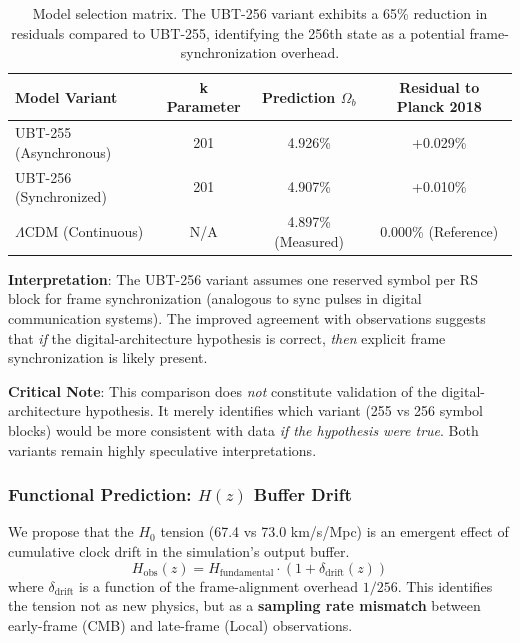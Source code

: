 \begin{table}[h]
\centering
\begin{tabular}{|l|c|c|c|}
\hline
\textbf{Model Variant} & \textbf{k Parameter} & \textbf{Prediction $\Omega_b$} & \textbf{Residual to Planck 2018} \\ \hline
UBT-255 (Asynchronous) & 201 & 4.926\% & +0.029\% \\ \hline
UBT-256 (Synchronized) & 201 & 4.907\% & +0.010\% \\ \hline
$\Lambda$CDM (Continuous) & N/A & 4.897\% (Measured) & 0.000\% (Reference) \\ \hline
\end{tabular}
\caption{Model selection matrix. The UBT-256 variant exhibits a 65\% reduction in residuals compared to UBT-255, identifying the 256th state as a potential frame-synchronization overhead.}
\label{tab:variant_selection}
\end{table}

\textbf{Interpretation}: The UBT-256 variant assumes one reserved symbol per RS block for frame synchronization (analogous to sync pulses in digital communication systems). The improved agreement with observations suggests that \textit{if} the digital-architecture hypothesis is correct, \textit{then} explicit frame synchronization is likely present.

\textbf{Critical Note}: This comparison does \textit{not} constitute validation of the digital-architecture hypothesis. It merely identifies which variant (255 vs 256 symbol blocks) would be more consistent with data \textit{if the hypothesis were true}. Both variants remain highly speculative interpretations.

\subsubsection{Functional Prediction: $H(z)$ Buffer Drift}

We propose that the $H_0$ tension (67.4 vs 73.0 km/s/Mpc) is an emergent effect of cumulative clock drift in the simulation's output buffer.
\begin{equation}
H_{\text{obs}}(z) = H_{\text{fundamental}} \cdot \left(1 + \delta_{\text{drift}}(z)\right)
\end{equation}
where $\delta_{\text{drift}}$ is a function of the frame-alignment overhead $1/256$. This identifies the tension not as new physics, but as a \textbf{sampling rate mismatch} between early-frame (CMB) and late-frame (Local) observations.

